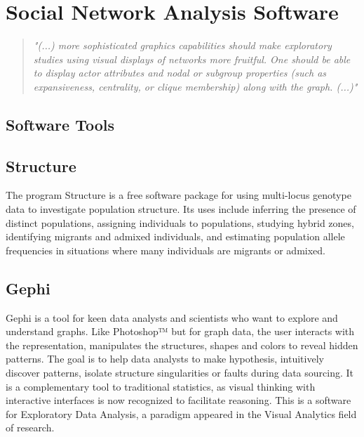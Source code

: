 \section{Social Network Analysis Software}
\label{sec:snas}

\begin{quote}
\textit{"(...) more sophisticated graphics capabilities should make exploratory studies using visual displays of networks more fruitful. One should be able to display actor attributes and nodal or subgroup properties (such as expansiveness, centrality, or clique membership) along with the graph. (...)"} \cite{wasserman1994social}
\end{quote}

\subsection{Software Tools}

\subsection{Structure}

\indent \indent The program Structure \cite{structure-software} is a free software package for using multi-locus genotype data to investigate population structure. Its uses include inferring the presence of distinct populations, assigning individuals to populations, studying hybrid zones, identifying migrants and admixed individuals, and estimating population allele frequencies in situations where many individuals are migrants or admixed.

\subsection{Gephi}

\indent \indent Gephi \cite{bastian2009gephi} is a tool for keen data analysts and scientists who want to explore and understand graphs. Like Photoshop™ but for graph data, the user interacts with the representation, manipulates the structures, shapes and colors to reveal hidden patterns. The goal is to help data analysts to make hypothesis, intuitively discover patterns, isolate structure singularities or faults during data sourcing. It is a complementary tool to traditional statistics, as visual thinking with interactive interfaces is now recognized to facilitate reasoning. This is a software for Exploratory Data Analysis, a paradigm appeared in the Visual Analytics field of research.

